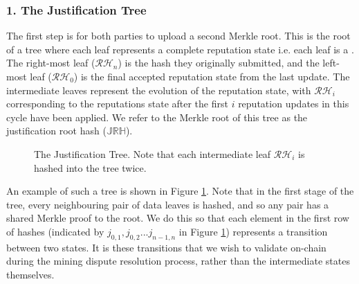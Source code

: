 \subsubsection*{1. The Justification Tree}
  \newcommand{\jrh}{\ensuremath{\mathbb{JRH}}}
 The first step is for both parties to upload a second Merkle root. This is the root of a tree where each leaf represents a complete reputation state i.e. each leaf is a . The right-most leaf ($\mathcal{RH}_n$) is the hash they originally submitted, and the left-most leaf ($\mathcal{RH}_0$) is the final accepted reputation state from the last update. The intermediate leaves represent the evolution of the reputation state, with $\mathcal{RH}_i$ corresponding to the reputations state after the first $i$ reputation updates in this cycle have been applied. We refer to the Merkle root of this tree as the justification root hash (\jrh).
\begin{figure}
\centering
{}
\caption{The Justification Tree. Note that each intermediate leaf $\mathcal{RH}_i$ is hashed into the tree twice. }
\label{fig:justification-tree}
\end{figure}
An example of such a tree is shown in Figure \ref{fig:justification-tree}. Note that in the first stage of the tree, every neighbouring pair of data leaves is hashed, and so any pair has a shared Merkle proof to the root. We do this so that each element in the first row of hashes (indicated by $j_{0,1}, j_{0,2} ...j_{n-1,n}$ in Figure \ref{fig:justification-tree}) represents a transition between two states. It is these transitions that we wish to validate on-chain during the mining dispute resolution process, rather than the intermediate states themselves.

